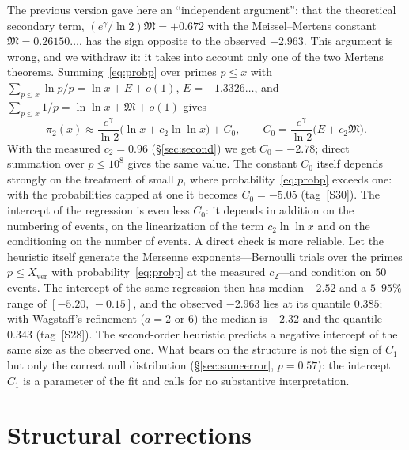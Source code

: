 \documentclass[11pt,a4paper]{article}
\theoremstyle{plain}
\theoremstyle{remark}
\newcommand{\eg}{e^{\gamma}}
\begin{document}
The previous version gave here an ``independent argument'': that the theoretical
secondary term, $(\eg/\ln2)\mathfrak M=+0.672$ with the Meissel--Mertens constant
$\mathfrak M=0.26150\ldots$, has the sign opposite to the observed $-2.963$. This
argument is wrong, and we withdraw it: it takes into account only one of the two
Mertens theorems. Summing~\eqref{eq:probp} over primes $p\le x$ with
$\sum_{p\le x}\ln p/p=\ln x+E+o(1)$, $E=-1.3326\ldots$, and
$\sum_{p\le x}1/p=\ln\ln x+\mathfrak M+o(1)$ gives
\[
\pi_2(x)\approx\frac{\eg}{\ln2}\bigl(\ln x+c_2\ln\ln x\bigr)+C_0,\qquad
C_0=\frac{\eg}{\ln2}\bigl(E+c_2\mathfrak M\bigr).
\]
With the measured $c_2=0.96$ (\S\ref{sec:second}) we get $C_0=-2.78$; direct
summation over $p\le10^8$ gives the same value. The constant $C_0$ itself depends
strongly on the treatment of small $p$, where probability~\eqref{eq:probp}
exceeds one: with the probabilities capped at one it becomes $C_0=-5.05$
(tag~[S30]). The intercept of the regression is even less $C_0$: it depends in
addition on the numbering of events, on the linearization of the term
$c_2\ln\ln x$ and on the conditioning on the number of events. A direct check is
more reliable. Let the heuristic itself generate the Mersenne
exponents---Bernoulli trials over the primes $p\le X_{\mathrm{ver}}$ with
probability~\eqref{eq:probp} at the measured $c_2$---and condition on $50$
events. The intercept of the same regression then has median $-2.52$ and a
$5$--$95\%$ range of $[-5.20,\,-0.15]$, and the observed $-2.963$ lies at its
quantile $0.385$; with Wagstaff's refinement ($a=2$ or $6$) the median is
$-2.32$ and the quantile $0.343$ (tag~[S28]). The second-order heuristic predicts
a negative intercept of the same size as the observed one. What bears on the
structure is not the sign of $C_1$ but only the correct null distribution
(\S\ref{sec:sameerror}, $p=0.57$): the intercept $C_1$ is a parameter of the fit
and calls for no substantive interpretation.

\section{Structural corrections}\label{sec:struct}
\end{document}
